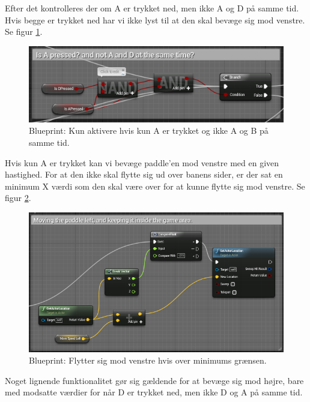 Efter det kontrolleres der om A er trykket ned, men ikke A og D på samme tid. Hvis begge er trykket ned har vi ikke lyst til at den skal bevæge sig mod venstre. Se figur \ref{dia:paddleisapressed}.

\begin{figure}
	\begin{center}
		\caption{Blueprint: Kun aktivere hvis kun A er trykket og ikke A og B på samme tid.}
		\label{dia:paddleisapressed}
		\includegraphics[width=0.80\linewidth]{pictures/blueprints/paddle-is-a-pressed}
		\end{center}
\end{figure}

Hvis kun A er trykket kan vi bevæge paddle'en mod venstre med en given hastighed. For at den ikke skal flytte sig ud over banens sider, er der sat en minimum X værdi som den skal være over for at kunne flytte sig mod venstre. Se figur \ref{dia:paddlemoveleft}. 

\begin{figure}
	\begin{center}
		\caption{Blueprint: Flytter sig mod venstre hvis over minimums grænsen.}
		\label{dia:paddlemoveleft}
		\includegraphics[width=0.98\linewidth]{pictures/blueprints/paddle-move-left}
		\end{center}
\end{figure}

Noget lignende funktionalitet gør sig gældende for at bevæge sig mod højre, bare med modsatte værdier for når D er trykket ned, men ikke D og A på samme tid.

